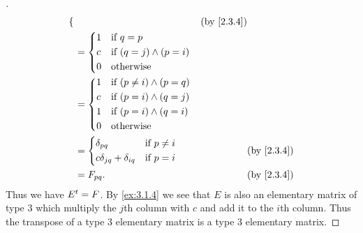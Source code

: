 \begin{proof}[]
\begin{align*}
\begin{dcases}
		                                                          \end{dcases}             &  & \by{2.3.4}                             \\
		                                                      & = \begin{dcases}
			                                                          1 & \text{if } q = p                 \\
			                                                          c & \text{if } (q = j) \land (p = i) \\
			                                                          0 & \text{otherwise}
		                                                          \end{dcases}                                 \\
		                                                      & = \begin{dcases}
			                                                          1 & \text{if } (p \neq i) \land (p = q) \\
			                                                          c & \text{if } (p = i) \land (q = j)    \\
			                                                          1 & \text{if } (p = i) \land (q = i)    \\
			                                                          0 & \text{otherwise}
		                                                          \end{dcases}                              \\
		                                                      & = \begin{dcases}
			                                                          \delta_{p q}                  & \text{if } p \neq i \\
			                                                          c \delta_{j q} + \delta_{i q} & \text{if } p = i
		                                                          \end{dcases} &  & \by{2.3.4}                  \\
		                                                      & = F_{p q}.                                             &  & \by{2.3.4}
	\end{align*}
	Thus we have \({E}^{t} = F\).
	By \cref{ex:3.1.4} we see that \(E\) is also an elementary matrix of type 3 which multiply the \(j\)th column with \(c\) and add it to the \(i\)th column.
	Thus the transpose of a type 3 elementary matrix is a type 3 elementary matrix.
\end{proof}

